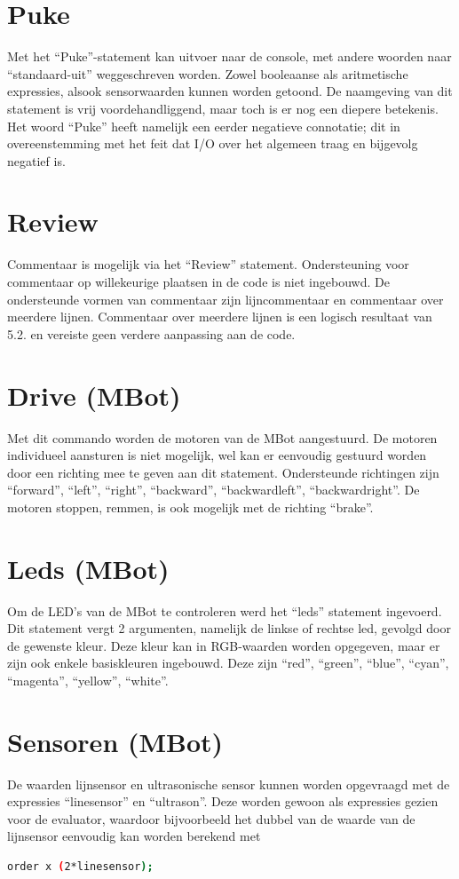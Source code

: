 \documentclass[12pt,a4paper]{report}
\begin{document}
\section{Puke}
Met het ``Puke''-statement kan uitvoer naar de console, met andere woorden naar ``standaard-uit'' weggeschreven worden. Zowel booleaanse als aritmetische expressies, alsook sensorwaarden kunnen worden getoond. De naamgeving van dit statement is vrij voordehandliggend, maar toch is er nog een diepere betekenis. Het woord ``Puke'' heeft namelijk een eerder negatieve connotatie; dit in overeenstemming met het feit dat I/O over het algemeen traag en bijgevolg negatief is.

\section{Review}
Commentaar is mogelijk via het ``Review'' statement. Ondersteuning voor commentaar op willekeurige plaatsen in de code is niet ingebouwd. De ondersteunde vormen van commentaar zijn lijncommentaar en commentaar over meerdere lijnen. Commentaar over meerdere lijnen is een logisch resultaat van \textsc{5.2.} en vereiste geen verdere aanpassing aan de code.

\section{Drive (MBot)}
Met dit commando worden de motoren van de MBot aangestuurd. De motoren individueel aansturen is niet mogelijk, wel kan er eenvoudig gestuurd worden door een richting mee te geven aan dit statement. Ondersteunde richtingen zijn ``forward'', ``left'', ``right'', ``backward'', ``backwardleft'', ``backwardright''. De motoren stoppen, remmen, is ook mogelijk met de richting ``brake''.

\section{Leds (MBot)}
Om de LED's van de MBot te controleren werd het ``leds'' statement ingevoerd. Dit statement vergt 2 argumenten, namelijk de linkse of rechtse led, gevolgd door de gewenste kleur. Deze kleur kan in RGB-waarden worden opgegeven, maar er zijn ook enkele basiskleuren ingebouwd. Deze zijn ``red'', ``green'', ``blue'', ``cyan'', ``magenta'', ``yellow'', ``white''.

\section{Sensoren (MBot)}
De waarden lijnsensor en ultrasonische sensor kunnen worden opgevraagd met de expressies ``linesensor'' en ``ultrason''. Deze worden gewoon als expressies gezien voor de evaluator, waardoor bijvoorbeeld het dubbel van de waarde van de lijnsensor eenvoudig kan worden berekend met
\begin{lstlisting}[language=Bash]
  order x (2*linesensor);
\end{lstlisting}
\end{document}
